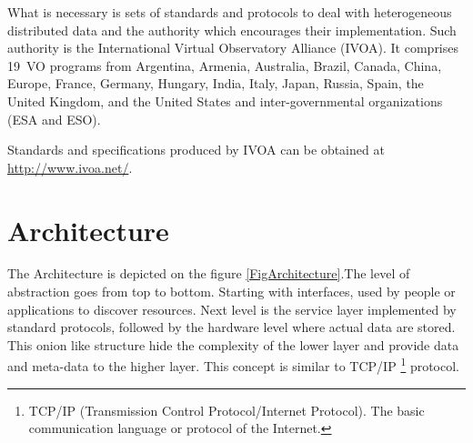     What is necessary is sets of standards and protocols to deal with
    heterogeneous distributed data and the authority which encourages
    their implementation. Such authority is the International Virtual
    Observatory Alliance (IVOA). It comprises 19~VO programs from
    Argentina, Armenia, Australia, Brazil, Canada, China, Europe,
    France, Germany, Hungary, India, Italy, Japan, Russia, Spain, the
    United Kingdom, and the United States and inter-governmental
    organizations (ESA and ESO)\cite{hanisch2010international}.
   
    Standards and specifications produced by IVOA can be obtained at
    \url{http://www.ivoa.net/}.



\section{Architecture}


The Architecture is depicted on the figure \ref{FigArchitecture}.The
level of abstraction goes from top to bottom. Starting with interfaces,
used by people or applications to discover resources.  Next level is
the service layer implemented by standard protocols, followed by the
hardware level where actual data are stored. This onion like structure
hide the complexity of the lower layer and provide data and meta-data
to the higher layer. This concept is similar to TCP/IP
\footnote{TCP/IP (Transmission Control Protocol/Internet Protocol).
  The basic communication language or protocol of the Internet.}
protocol.


